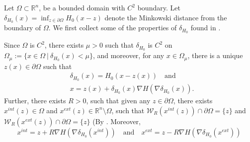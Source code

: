 \documentclass[11pt]{amsart}
\newcommand{\R}{\mathbb{R}}
\numberwithin{equation}{section}
\begin{document}
  Let $\Omega\subset\R^{n}$, be a bounded domain with $C^{2}$ boundary. Let $\delta_{H_{0}}(x)=\inf_{z\in \partial\Omega}H_{0}(x-z)$ denote the Minkowski distance from the boundary of $\Omega$. We first collect some of the properties of $\delta_{H_{0}}$ found in \cite{CrastaMalusa2007}. 

Since $\Omega$ is $C^{2}$, there exists $\mu>0$ such that $\delta_{H_{0}}$ is $C^{2}$ on $\Omega_{\mu}:=\{x\in\Omega~|~\delta_{H_{0}}(x)<\mu\}$, and moreover, for any $x\in \Omega_{\mu}$, there is a unique $z(x)\in \partial\Omega$ such that
 \begin{equation}\label{rep of x in Omega mu}
 \begin{split}
    &\delta_{H_{0}}(x)=H_{0}(x-z(x)) \quad\text{and}\\
   & x=z(x)+\delta_{H_{0}}(x)\nabla H(\nabla\delta_{H_{0}}(x)).
 \end{split}
       \end{equation} 
Further, there exists $R>0$, such that given any $z\in \partial\Omega$, there exists $x^{int}(z)\in \Omega$ and $x^{ext}(z)\in \R^{n}\setminus\Omega$, such that $\mathcal{W}_{R}(x^{int}(z))\cap \partial\Omega=\{z\}$ and $\mathcal{W}_{R}\left(x^{ext}(z)\right)\cap \partial\Omega=\{z\}$ (By \cite[Remark 4.2, Proposition 3.3 and also Proposition 4.6]{CrastaMalusa2007}. Moreover,
\begin{equation}\label{rep of center of ball}
    x^{int}=z+R\nabla H\left(\nabla \delta_{H_{0}}(x^{int})\right)\quad \text{and}\quad x^{ext}= z-R\nabla H\left(\nabla \delta_{H_{0}}(x^{ext})\right)
\end{equation}
\end{document}
